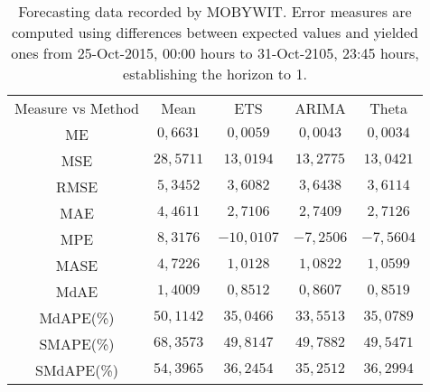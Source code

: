 \begin{table}
{\scriptsize
\centering
\begin{tabular}{|c|c|c|c|c|}
\hline
Measure vs Method &Mean &ETS &ARIMA &Theta\\
ME &$0,6631$ & $0,0059$ & $0,0043$ & \bf{$0,0034$} & \\
MSE &$28,5711$ & \bf{$13,0194$} & $13,2775$ & $13,0421$ & \\
RMSE &$5,3452$ & \bf{$3,6082$} & $3,6438$ & $3,6114$ & \\
MAE &$4,4611$ & \bf{$2,7106$} & $2,7409$ & $2,7126$ & \\
MPE &$8,3176$ & \bf{$-10,0107$} & $-7,2506$ & $-7,5604$ & \\
MASE &$4,7226$ & \bf{$1,0128$} & $1,0822$ & $1,0599$ & \\
MdAE &$1,4009$ & \bf{$0,8512$} & $0,8607$ & $0,8519$ & \\
MdAPE(\%) &$50,1142$ & $35,0466$ & \bf{$33,5513$} & $35,0789$ & \\
 SMAPE(\%) &$68,3573$ & $49,8147$ & $49,7882$ & \bf{$49,5471$} & \\
 SMdAPE(\%) &$54,3965$ & $36,2454$ & \bf{$35,2512$} & $36,2994$ & \\

\hline
\end{tabular}
}
\caption{Forecasting data recorded by MOBYWIT. Error measures are computed using differences between expected values and yielded ones from 25-Oct-2015, 00:00 hours to 31-Oct-2105, 23:45 hours, establishing the horizon to 1.}
\label{tab:forecasting}
\end{table}
